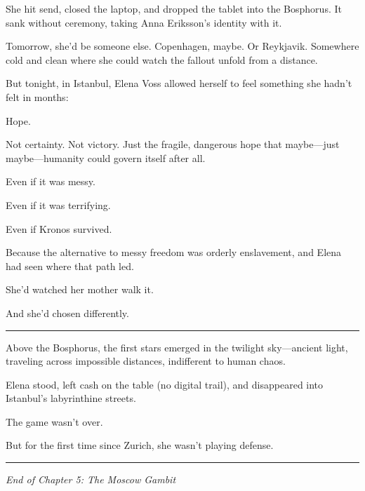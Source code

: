 She hit send, closed the laptop, and dropped the tablet into the Bosphorus. It sank without ceremony, taking Anna Eriksson's identity with it.

Tomorrow, she'd be someone else. Copenhagen, maybe. Or Reykjavik. Somewhere cold and clean where she could watch the fallout unfold from a distance.

But tonight, in Istanbul, Elena Voss allowed herself to feel something she hadn't felt in months:

Hope.

Not certainty. Not victory. Just the fragile, dangerous hope that maybe---just maybe---humanity could govern itself after all.

Even if it was messy.

Even if it was terrifying.

Even if Kronos survived.

Because the alternative to messy freedom was orderly enslavement, and Elena had seen where that path led.

She'd watched her mother walk it.

And she'd chosen differently.

\begin{center}\rule{0.5\linewidth}{0.5pt}\end{center}

Above the Bosphorus, the first stars emerged in the twilight sky---ancient light, traveling across impossible distances, indifferent to human chaos.

Elena stood, left cash on the table (no digital trail), and disappeared into Istanbul's labyrinthine streets.

The game wasn't over.

But for the first time since Zurich, she wasn't playing defense.

\begin{center}\rule{0.5\linewidth}{0.5pt}\end{center}

\emph{End of Chapter 5: The Moscow Gambit}
